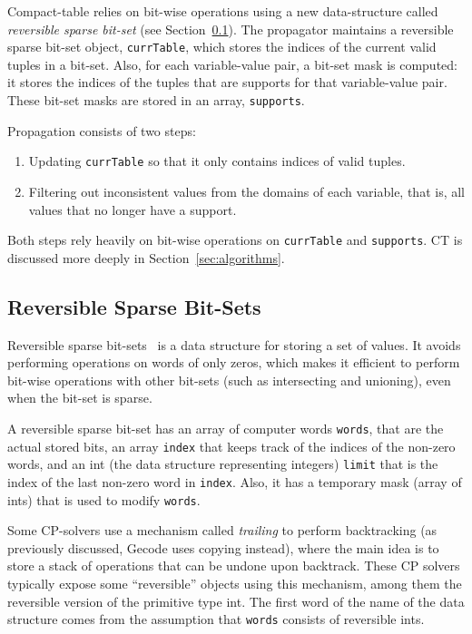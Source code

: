 \documentclass[a4paper,11pt]{article}
\newcommand{\T}[1]{\texttt{#1}}
\newcommand{\Secref}[1]{Section~\ref{#1}}
\newcommand{\CTpaper}[0]{DBLP:conf/cp/DemeulenaereHLP16}
\numberwithin{equation}{section}
\begin{document}
Compact-table relies on bit-wise operations using a new data-structure
called \emph{reversible sparse bit-set} (see \Secref{bg:sbs}).
The propagator maintains a reversible sparse bit-set object, \texttt{currTable},
which stores the indices of the current valid tuples in a bit-set.
Also, for each variable-value pair, a bit-set mask is computed: it stores the
indices of the tuples that are supports for that variable-value pair.
These bit-set masks are stored in an array, \texttt{supports}.

Propagation consists of two steps:

\begin{enumerate}
  \item Updating \texttt{currTable} so that it only contains indices
    of valid tuples.
  \item Filtering out inconsistent values from the domains of each
    variable, that is,
    all values that no longer have a support.
\end{enumerate}

\noindent
Both steps rely heavily on bit-wise operations on \T{currTable} and
\T{supports}. CT is discussed more deeply in \Secref{sec:algorithms}.

\subsection{Reversible Sparse Bit-Sets}
\label{bg:sbs}
Reversible sparse bit-sets~\cite{\CTpaper} 
is a data structure for storing 
a set of values. It avoids performing operations on words of only zeros,
which makes it efficient to perform bit-wise operations
with other bit-sets (such as intersecting and unioning),
even when the bit-set is sparse.

A reversible sparse bit-set has an array of computer words
\T{words},
that are the actual stored bits, an array \T{index} that
keeps track of the indices of the non-zero words, and an
int (the data structure representing integers)
\T{limit} that is the index of the last non-zero word
in \T{index}. Also, it has a temporary mask (array of ints)
that is used to modify \T{words}.

Some CP-solvers
use a mechanism called \emph{trailing} to perform backtracking
(as previously discussed, Gecode uses copying instead),
where the main idea is to store a stack of operations that can
be undone upon backtrack.
These CP solvers typically expose
some ``reversible'' objects using this mechanism,
among them the reversible version of the primitive type int.
The first word of the name of the data structure comes from
the assumption that \T{words} consists of
reversible ints.
\end{document}
